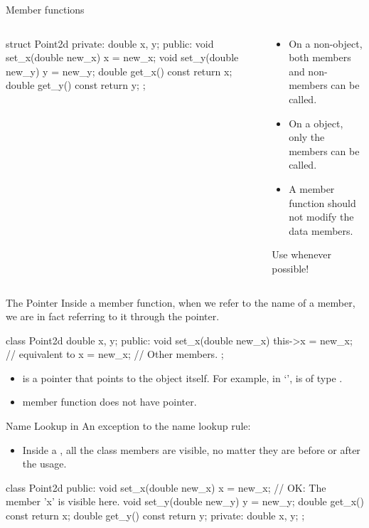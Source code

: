 \documentclass{beamer}
\begin{document}
\begin{frame}[fragile]{\const Member functions}
    \begin{columns}
        \begin{column}{0.5\linewidth}
            \begin{cpp}
struct Point2d {
 private:
  double x, y;
 public:
  void set_x(double new_x)
    { x = new_x; }
  void set_y(double new_y)
    { y = new_y; }
  double get_x() const
    { return x; }
  double get_y() const
    { return y; }
};
            \end{cpp}        
        \end{column}
        \begin{column}{0.5\linewidth}
            \begin{itemize}
                \item On a non-\const object, both \const members and non-\const members can be called.
                \item On a \const object, only the \const members can be called.
                \item A \const member function should not modify the data members.
            \end{itemize}
            Use \const whenever possible!
        \end{column}
    \end{columns}
\end{frame}

\begin{frame}[fragile]{The \this Pointer}
    Inside a member function, when we refer to the name of a member, we are in fact referring to it through the \this pointer.
    \begin{cpp}
class Point2d {
  double x, y;
 public:
  void set_x(double new_x) {
    this->x = new_x;    // equivalent to x = new_x;
  }
  // Other members.
};
    \end{cpp}
    \begin{itemize}
        \item \this is a pointer that points to the object itself. For example, in `', \this is of type .
        \item {} member function does not have  pointer.
    \end{itemize}
\end{frame}

\begin{frame}[fragile]{Name Lookup in \class}
    An exception to the name lookup rule:
    \begin{itemize}
        \item Inside a \class, all the class members are visible, no matter they are before or after the usage.
    \end{itemize}
    \begin{cpp}
class Point2d {
 public:
  void set_x(double new_x)
    { x = new_x; }      // OK: The member 'x' is visible here.
  void set_y(double new_y)
    { y = new_y; }
  double get_x() const
    { return x; }
  double get_y() const
    { return y; }
 private:
  double x, y;
};
    \end{cpp}
\end{frame}
\end{document}
